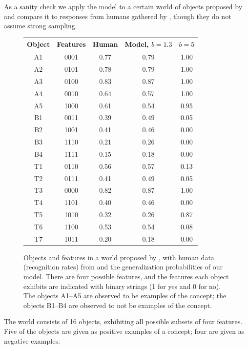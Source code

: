 \documentclass[apacite,jou]{apa6}
\begin{document}
As a sanity check we apply the model to a certain world of objects
proposed by \citet{medin}
and compare it to responses from humans 
gathered by \citet{nosofsky},
 though they
do not assume strong sampling.

\begin{figure}
\centering
\begin{tabular*}{\columnwidth}{@{\extracolsep{\fill} } ccccc}
	\toprule
	Object & Features & Human & Model, $b=1.3$ & $b=5$ \\ \midrule
	A1 & 0001 & 0.77 & 0.79 & 1.00 \\
	A2 & 0101 & 0.78 & 0.79 & 1.00 \\
	A3 & 0100 & 0.83 & 0.87 & 1.00 \\
	A4 & 0010 & 0.64 & 0.57 & 1.00 \\
	A5 & 1000 & 0.61 & 0.54 & 0.95 \\\midrule
	B1 & 0011 & 0.39 & 0.49 & 0.05 \\
	B2 & 1001 & 0.41 & 0.46 & 0.00 \\
	B3 & 1110 & 0.21 & 0.26 & 0.00 \\
	B4 & 1111 & 0.15 & 0.18 & 0.00 \\ \midrule
	T1 & 0110 & 0.56 & 0.57 & 0.13 \\
	T2 & 0111 & 0.41 & 0.49 & 0.05 \\
	T3 & 0000 & 0.82 & 0.87 & 1.00 \\
	T4 & 1101 & 0.40 & 0.46 & 0.00 \\
	T5 & 1010 & 0.32 & 0.26 & 0.87 \\
	T6 & 1100 & 0.53 & 0.54 & 0.08 \\
	T7 & 1011 & 0.20 & 0.18 & 0.00 \\\bottomrule
\end{tabular*}
\bigskip\mbox{}
\caption{Objects and features in a world proposed by \citet{medin},
	with human data
	(recognition rates) from \citet{nosofsky} and the
	generalization probabilities of our model.
	There are four possible features, and the features each
	object exhibits are indicated with binary strings (1 for yes
	and 0 for no). The objects A1--A5 are observed to be
	examples of the concept; the objects B1--B4 are observed
	to not be examples of the concept.}
\label{medindata}
\end{figure}

The world consists of 16 objects, exhibiting all possible
subsets of four features. Five of the objects are given as
positive examples of a concept; four are given as negative
examples.
\end{document}
